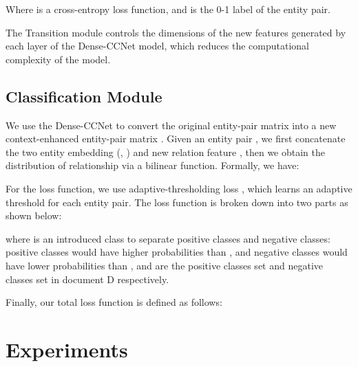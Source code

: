 \documentclass[11pt]{article}
\begin{document}
Where  is a cross-entropy loss function, and  is the 0-1 label of the entity pair.

The Transition module controls the dimensions of the new features generated by each layer of the Dense-CCNet model, which reduces the computational complexity of the model.








\subsection{Classification Module}
\label{sec2.3}
We use the Dense-CCNet to convert the original entity-pair matrix  into a new context-enhanced entity-pair matrix .
Given an entity pair , we first concatenate the two entity embedding (, ) and new relation feature , then we obtain the distribution of relationship via a bilinear function. Formally, we have:


For the loss function, we use adaptive-thresholding loss \cite{c:112}, which learns an adaptive threshold for each entity pair. 
The loss function is broken down into two parts as shown below:

where  is an introduced class to separate positive classes and negative classes: positive classes would have higher probabilities than , and negative classes would have lower probabilities than ,  and  are the positive classes set and negative classes set in document D  respectively.

Finally, our total loss function is defined as follows:



\section{Experiments}
\end{document}
